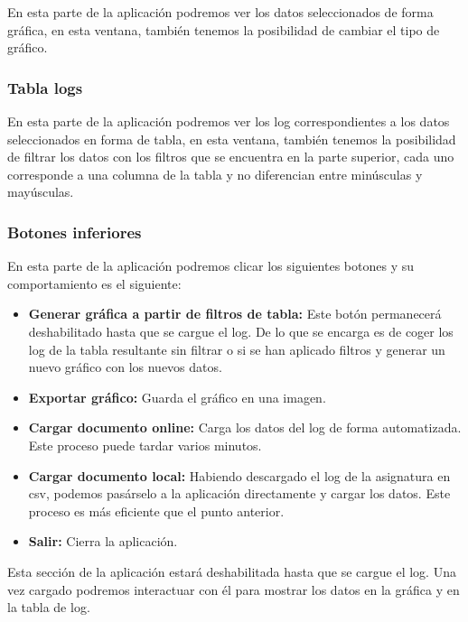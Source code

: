 En esta parte de la aplicación podremos ver los datos seleccionados de forma gráfica, en esta ventana, también tenemos la posibilidad de cambiar el tipo de gráfico.


\subsubsection{Tabla logs}

En esta parte de la aplicación podremos ver los log correspondientes a los datos seleccionados en forma de tabla, en esta ventana, también tenemos la posibilidad de filtrar los datos con los filtros que se encuentra en la parte superior, cada uno corresponde a una columna de la tabla y no diferencian entre minúsculas y mayúsculas.


\subsubsection{Botones inferiores}

En esta parte de la aplicación podremos clicar los siguientes botones y su comportamiento es el siguiente:

\begin{itemize}
	\tightlist
	\item
	\textbf{Generar gráfica a partir de filtros de tabla:} Este botón permanecerá deshabilitado hasta que se cargue el log. De lo que se encarga es de coger los log de la tabla resultante sin filtrar o si se han aplicado filtros y generar un nuevo gráfico con los nuevos datos.
	\item
	\textbf{Exportar gráfico:} Guarda el gráfico en una imagen.
	\item
	\textbf{Cargar documento online:} Carga los datos del log de forma automatizada. Este proceso puede tardar varios minutos.
	\item
	\textbf{Cargar documento local:} Habiendo descargado el log de la asignatura en csv, podemos pasárselo a la aplicación directamente y cargar los datos. Este proceso es más eficiente que el punto anterior.
	\item
	\textbf{Salir:} Cierra la aplicación.
	
	
\end{itemize}


Esta sección de la aplicación estará deshabilitada hasta que se cargue el log. Una vez cargado podremos interactuar con él para mostrar los datos en la gráfica y en la tabla de log.


